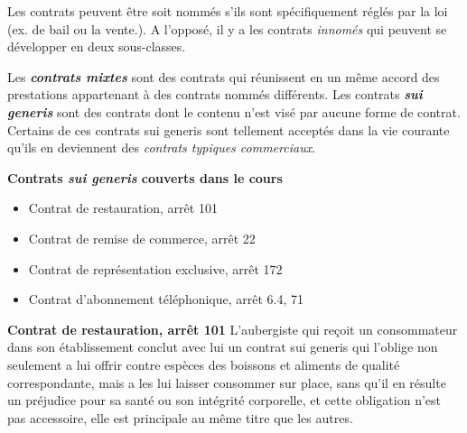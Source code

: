 Les contrats peuvent être soit nommés s'ils sont spécifiquement réglés par la loi (ex. de bail ou la vente.). A l'opposé, il y a les contrats \textit{innomés} qui peuvent se développer en deux sous-classes.

Les \textbf{\textit{contrats mixtes}} sont des contrats qui réunissent en un même accord des prestations appartenant à des contrats nommés différents. Les contrats \textit{\textbf{sui generis}} sont des contrats dont le contenu n'est visé par aucune forme de contrat. Certains de ces contrats sui generis sont tellement acceptés dans la vie courante qu'ils en deviennent des \textit{contrats typiques commerciaux}.

\textbf{Contrats \textit{sui generis} couverts dans le cours}

\begin{itemize}
    \item Contrat de restauration, arrêt 101
    \item Contrat de remise de commerce, arrêt 22
    \item Contrat de représentation exclusive, arrêt 172
    \item Contrat d’abonnement téléphonique, arrêt 6.4, 71
\end{itemize}

\textbf{Contrat de restauration, arrêt 101}
L'aubergiste qui reçoit un consommateur dans son établissement conclut avec lui un contrat sui generis qui l'oblige non seulement a lui offrir contre espèces des boissons et aliments de qualité correspondante, mais a les lui laisser consommer sur place, sans qu'il en résulte un préjudice pour sa santé ou son intégrité corporelle, et cette obligation n'est pas accessoire, elle est principale au même titre que les autres.